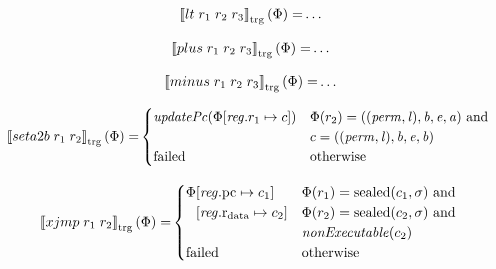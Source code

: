 \documentclass[a4paper]{article}
\newcommand{\sem}[1]{\left\llbracket #1 \right\rrbracket}
\newcommand{\tsem}[2][\Phi]{\sem{#2}_{\mathrm{trg}}(#1)}
\newcommand{\tand}{\text{ and }}
\newcommand{\totherwise}{\text{otherwise }}
\newcommand{\targetcolor}[1]{\color{black}}
\newcommand{\trg}[1]{{\targetcolor{} #1}}
\newcommand{\zinstr}[1]{#1}
\newcommand{\twoinstr}[3]{
  \ifthenelse{\equal{#2#3}{}}
  {\zinstr{#1}}
  {\zinstr{#1} \; #2 \; #3}
}
\newcommand{\threeinstr}[4]{
  \ifthenelse{\equal{#2#3#4}{}}
  {\zinstr{#1}}
  {\zinstr{#1} \; #2 \; #3 \; #4}
}
\newcommand{\txjmp}[2]{\twoinstr{\trg{xjmp}}{#1}{#2}}
\newcommand{\tsetatob}[2]{\twoinstr{\trg{seta2b}}{#1}{#2}}
\newcommand{\tlt}[3]{\threeinstr{\trg{lt}}{#1}{#2}{#3}}
\newcommand{\tplus}[3]{\threeinstr{\trg{plus}}{#1}{#2}{#3}}
\newcommand{\tminus}[3]{\threeinstr{\trg{minus}}{#1}{#2}{#3}}
\newcommand{\update}[2]{[#1 \mapsto #2]}
\newcommand{\shareddom}[1]{\mathrm{#1}}
\newcommand{\perm}{\var{perm}}
\newcommand{\lin}{\var{l}}
\newcommand{\sealed}[1]{\shareddom{sealed}(#1)}
\newcommand{\failed}{\mathrm{failed}}
\newcommand{\var}[1]{\mathit{#1}}
\newcommand{\reg}{\var{reg}}
\newcommand{\baddr}{\var{b}}
\newcommand{\eaddr}{\var{e}}
\newcommand{\aaddr}{\var{a}}
\newcommand{\pcreg}{\mathrm{pc}}
\newcommand{\rdata}{\mathrm{r}_\mathrm{data}}
\newcommand{\plainfun}[2]{
  \ifthenelse{\equal{#2}{}}
  {\mathit{#1}}
  {\mathit{#1}(#2)}
}
\newcommand{\updPcAddr}[1]{\plainfun{updatePc}{#1}}
\newcommand{\nonExec}[1]{\plainfun{nonExecutable}{#1}}
\begin{document}
\begin{align*}
  \tsem{\tlt{r_1}{r_2}{r_3}} = & \dots
\end{align*}

\begin{align*}
  \tsem{\tplus{r_1}{r_2}{r_3}} = & \dots
\end{align*}

\begin{align*}
  \tsem{\tminus{r_1}{r_2}{r_3}} = & \dots
\end{align*}

\begin{align*}
  \tsem{\tsetatob{r_1}{r_2}} = & 
                                 \begin{cases}
                                   \updPcAddr{\Phi\update{\reg.r_1}{c}} &
                                   \arraycolsep=0pt
                                   \begin{array}[t]{l}
                                     \Phi(r_2) = ((\perm,\lin),\baddr,\eaddr,\aaddr) \tand \\
                                     c = ((\perm,\lin),\baddr,\eaddr,\baddr) \\
                                   \end{array}
                                   \\
                                   \failed & \totherwise
                                 \end{cases}
\end{align*}

\begin{align*}
  \tsem{\txjmp{r_1}{r_2}} = & 
                              \begin{cases}
                                \Phi
                                \arraycolsep=0pt
                                \begin{array}[t]{l}
                                  \update{\reg.\pcreg}{c_1} \\
                                  \update{\reg.\rdata}{c_2}
                                \end{array} & 
                                \arraycolsep=0pt
                                \begin{array}[t]{l}
                                  \Phi(r_1) = \sealed{c_1,\sigma} \text{ and } \\
                                  \Phi(r_2) = \sealed{c_2,\sigma} \text{ and } \\
                                  \nonExec{c_2}
                                \end{array}
\\
\failed & \text{otherwise}
                              \end{cases}
\end{align*}
\end{document}
